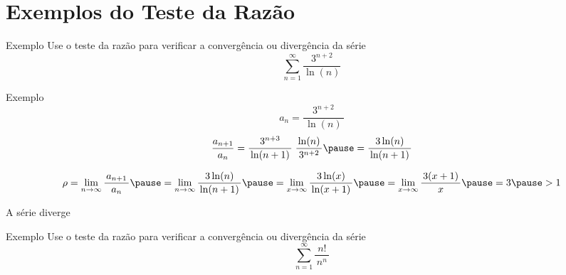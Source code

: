\section{Exemplos do Teste da Razão}

\addtocounter{exemplo}{1}
\begin{frame}{Exemplo \theexemplo}
  Use o teste da razão para verificar a convergência ou divergência da série
  \[
    \sum_{n=1}^\infty\frac{3^{n+2}}{\ln(n)}
  \]
\end{frame}

\begin{frame}{Exemplo \theexemplo}
  \[
    a_n = \frac{\,3^{n+2}\,}{\,\ln(n)\,}
  \]
  \pause
  \[
    \frac{a_{n+1}}{a_n}
     = \frac{3^{n+3}}{\,\ln(n+1)\,} \; \frac{\,\ln(n)\,}{\,3^{n+2}\,}
     \pause
     = \frac{3\ln(n)}{\,\ln(n+1)\,}
  \]

  \pause
  \vspace{0.5\baselineskip}
  \[
    \rho
    = \lim_{n\to\infty} \frac{\,a_{n+1}\,}{a_n}
    \pause
    = \lim_{n\to\infty} \frac{3\ln(n)}{\,\ln(n+1)\,}
    \pause
    = \lim_{x\to\infty} \frac{3\ln(x)}{\,\ln(x+1)\,}
    \pause
    = \lim_{x\to\infty} \frac{\,3(x+1)\,}{x}
    \pause
    = 3
    \pause
    > 1
  \]

  A série diverge
\end{frame}

\addtocounter{exemplo}{1}
\begin{frame}{Exemplo \theexemplo}
  Use o teste da razão para verificar a convergência ou divergência da série
  \[
    \sum_{n=1}^\infty \frac{n!}{\,n^n\,}
  \]
\end{frame}


